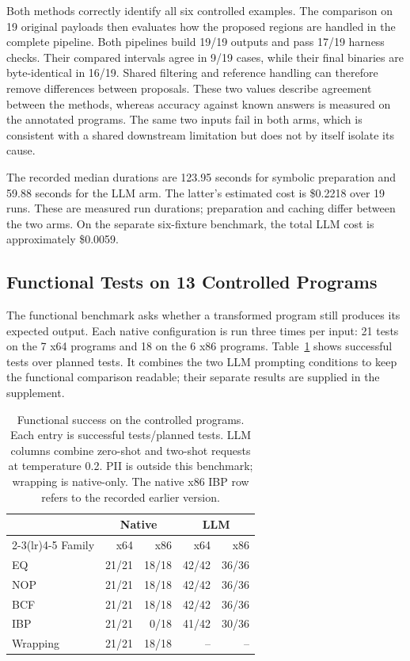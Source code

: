 Both methods correctly identify all six controlled examples. The
comparison on 19 original payloads then evaluates how the proposed
regions are handled in the complete pipeline. Both pipelines build 19/19 outputs and pass
17/19 harness checks. Their compared intervals agree in 9/19 cases,
while their final binaries are byte-identical in 16/19. Shared filtering
and reference handling can therefore remove differences between proposals.
These two values describe agreement between the methods, whereas
accuracy against known answers is measured on the annotated programs. The same two inputs fail in both arms, which is consistent with
a shared downstream limitation but does not by itself isolate its cause.

The recorded median durations are 123.95 seconds for symbolic preparation
and 59.88 seconds for the LLM arm. The latter's estimated cost is \$0.2218
over 19 runs. These are measured run durations; preparation and caching differ
between the two arms. On the separate six-fixture benchmark,
the total LLM cost is approximately \$0.0059. 

\subsection{Functional Tests on 13 Controlled Programs}
The functional benchmark asks whether a transformed program still produces
its expected output. Each native configuration is run three times per
input: 21 tests on the 7 x64 programs and 18 on the 6 x86 programs.
Table~\ref{tab:controlled_functional} shows successful tests over planned
tests. It combines the two LLM prompting conditions to keep the functional
comparison readable; their separate results are supplied in the supplement.

\begin{table}[t]
\caption{Functional success on the controlled programs. Each entry is
successful tests/planned tests. LLM columns combine zero-shot and two-shot
requests at temperature 0.2. PII is outside this benchmark; wrapping is
native-only. The native x86 IBP row refers to the recorded earlier version.}
\label{tab:controlled_functional}
\centering\small\setlength{\tabcolsep}{7pt}
\begin{tabular}{@{}lrrrr@{}}
\toprule
 & \multicolumn{2}{c}{Native} & \multicolumn{2}{c}{LLM} \\
\cmidrule(lr){2-3}\cmidrule(lr){4-5}
Family & x64 & x86 & x64 & x86 \\
\midrule
EQ & 21/21 & 18/18 & 42/42 & 36/36 \\
NOP & 21/21 & 18/18 & 42/42 & 36/36 \\
BCF & 21/21 & 18/18 & 42/42 & 36/36 \\
IBP & 21/21 & 0/18 & 41/42 & 30/36 \\
Wrapping & 21/21 & 18/18 & -- & -- \\
\bottomrule
\end{tabular}
\end{table}

